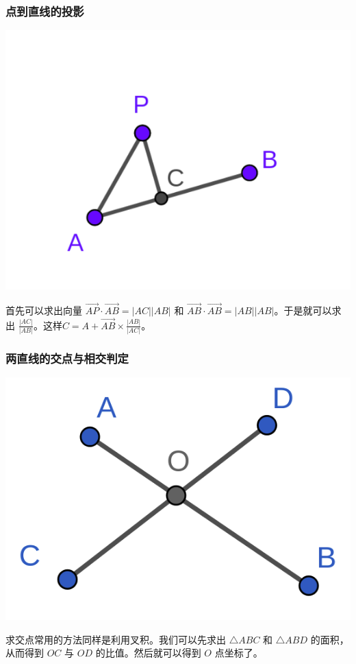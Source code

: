 \documentclass[10pt]{beamer}
\begin{document}
\begin{CJK}{UTF8}{gkai}
\begin{spacing}{1.2}
\begin{frame}
		\end{frame}
		\begin{frame}
			\frametitle{点到直线的投影}
			\begin{center}
			\includegraphics[scale=0.18]{../Pictures/Line_Projection.png}
			\end{center}

			首先可以求出向量 $\overrightarrow{AP} \cdot \overrightarrow{AB} = |AC||AB|$ 和 $\overrightarrow{AB} \cdot \overrightarrow{AB} = |AB||AB|$。于是就可以求出 $\frac{|AC|}{|AB|}$。这样$C = A + \overrightarrow{AB} \times \frac{|AB|}{|AC|}$。
		\end{frame}
		\begin{frame}
			\frametitle{两直线的交点与相交判定}
			\begin{center}
			\includegraphics[scale=0.14]{../Pictures/Line_Intersection.png}
			\end{center}
			求交点常用的方法同样是利用叉积。我们可以先求出 $\triangle ABC$ 和 $\triangle ABD$ 的面积，从而得到 $OC$ 与 $OD$ 的比值。然后就可以得到 $O$ 点坐标了。 \pause


\end{frame}
\end{spacing}
\end{CJK}
\end{document}
